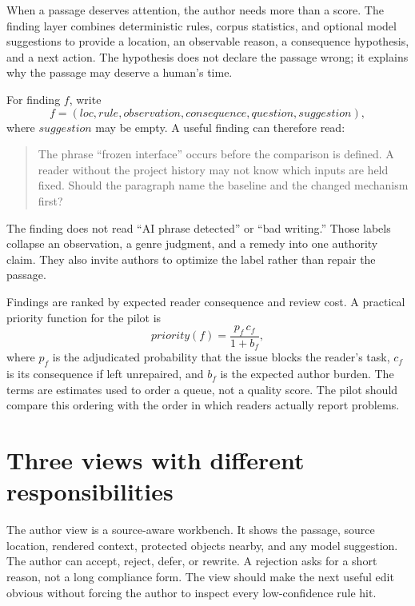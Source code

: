 When a passage deserves attention, the author needs more than a score. The
finding layer combines deterministic rules, corpus statistics, and optional
model suggestions to provide a location, an observable reason, a consequence
hypothesis, and a next action. The hypothesis does not declare the passage
wrong; it explains why the passage may deserve a human's time.

For finding $f$, write
\begin{equation}
  f=(loc, rule, observation, consequence, question, suggestion),
  \label{eq:architecture-finding}
\end{equation}
where $suggestion$ may be empty. A useful finding can therefore read:

\begin{quote}
The phrase ``frozen interface'' occurs before the comparison is defined. A
reader without the project history may not know which inputs are held fixed.
Should the paragraph name the baseline and the changed mechanism first?
\end{quote}

The finding does not read ``AI phrase detected'' or ``bad writing.'' Those
labels collapse an observation, a genre judgment, and a remedy into one
authority claim. They also invite authors to optimize the label rather than
repair the passage.

Findings are ranked by expected reader consequence and review cost. A practical
priority function for the pilot is
\begin{equation}
  priority(f)=\frac{p_f\,c_f}{1+b_f},
  \label{eq:architecture-priority}
\end{equation}
where $p_f$ is the adjudicated probability that the issue blocks the reader's
task, $c_f$ is its consequence if left unrepaired, and $b_f$ is the expected
author burden. The terms are estimates used to order a queue, not a quality
score. The pilot should compare this ordering with the order in which readers
actually report problems.

\section{Three views with different responsibilities}
\label{sec:architecture-views}

The author view is a source-aware workbench. It shows the passage, source
location, rendered context, protected objects nearby, and any model suggestion.
The author can accept, reject, defer, or rewrite. A rejection asks for a short
reason, not a long compliance form. The view should make the next useful edit
obvious without forcing the author to inspect every low-confidence rule hit.

